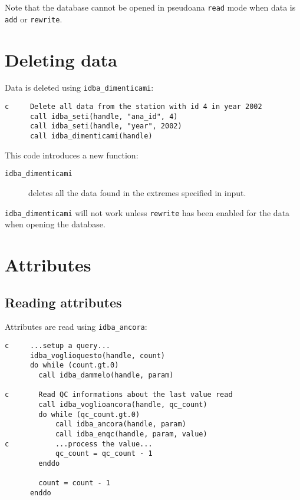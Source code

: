 \documentclass[final,12pt,a4paper,twoside]{book}
\begin{document}
Note that the database cannot be opened in pseudoana {\tt read} mode when data
is {\tt add} or {\tt rewrite}.
  
\section{Deleting data}

Data is deleted using {\tt idba\_dimenticami}:
\label{fun-idba_dimenticami}

\begin{verbatim}
c     Delete all data from the station with id 4 in year 2002
      call idba_seti(handle, "ana_id", 4)
      call idba_seti(handle, "year", 2002)
      call idba_dimenticami(handle)
\end{verbatim}

This code introduces a new function:

\begin{description}
\item[{\tt idba\_dimenticami}]
  deletes all the data found in the extremes specified in input.
\end{description}

{\tt idba\_dimenticami} will not work unless {\tt rewrite} has been enabled for
the data when opening the database.

\section {Attributes}

\subsection{Reading attributes}

Attributes are read using {\tt idba\_ancora}:
\label{fun-idba_voglioancora}
\label{fun-idba_ancora}

\begin{verbatim}
c     ...setup a query...
      idba_voglioquesto(handle, count)
      do while (count.gt.0)
        call idba_dammelo(handle, param)

c       Read QC informations about the last value read
        call idba_voglioancora(handle, qc_count)
        do while (qc_count.gt.0)
            call idba_ancora(handle, param) 
            call idba_enqc(handle, param, value)
c           ...process the value...
            qc_count = qc_count - 1
        enddo

        count = count - 1
      enddo
\end{verbatim}
\end{document}
